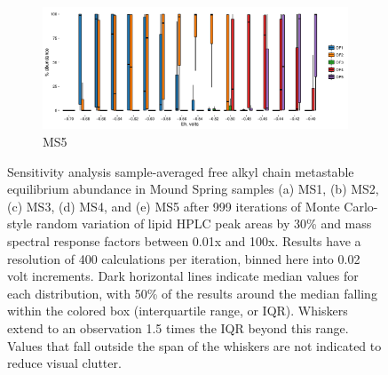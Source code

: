 \begin{figure}[h]\ContinuedFloat

    \begin{subfigure}[b]{\linewidth}
    	\includegraphics[width=\linewidth]{"figs_app2/boxplot_ggplot_02bin Mound OF5 iter 999"}
    	\caption{MS5}
        \label{fig:MS5_mc}
    \end{subfigure}
    
    \caption[Sensitivity analysis sample-averaged free alkyl chain metastable equilibrium abundance in Mound Spring samples]{Sensitivity analysis sample-averaged free alkyl chain metastable equilibrium abundance in Mound Spring samples (a) MS1, (b) MS2, (c) MS3, (d) MS4, and (e) MS5 after 999 iterations of Monte Carlo-style random variation of lipid HPLC peak areas by 30\% and mass spectral response factors between 0.01x and 100x. Results have a resolution of 400 calculations per iteration, binned here into 0.02 volt increments. Dark horizontal lines indicate median values for each distribution, with 50\% of the results around the median falling within the colored box (interquartile range, or IQR). Whiskers extend to an observation 1.5 times the IQR beyond this range. Values that fall outside the span of the whiskers are not indicated to reduce visual clutter.}
    \label{fig:MS_mc}
\end{figure}


\newpage

